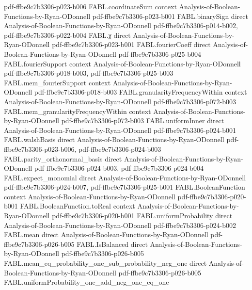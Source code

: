 \begin{theorem}
  {pdf-ffbe9c7b3306-p023-b006}
\proofstep
  {FABL.coordinateSum}
  {context}
  {Analysis-of-Boolean-Functions-by-Ryan-ODonnell}
  {pdf-ffbe9c7b3306-p023-b001}
\proofstep
  {FABL.binarySign}
  {direct}
  {Analysis-of-Boolean-Functions-by-Ryan-ODonnell}
  {pdf-ffbe9c7b3306-p014-b002,
    pdf-ffbe9c7b3306-p022-b004}
\proofstep
  {FABL.χ}
  {direct}
  {Analysis-of-Boolean-Functions-by-Ryan-ODonnell}
  {pdf-ffbe9c7b3306-p023-b001}
\proofstep
  {FABL.fourierCoeff}
  {direct}
  {Analysis-of-Boolean-Functions-by-Ryan-ODonnell}
  {pdf-ffbe9c7b3306-p025-b004}
\proofstep
  {FABL.fourierSupport}
  {context}
  {Analysis-of-Boolean-Functions-by-Ryan-ODonnell}
  {pdf-ffbe9c7b3306-p018-b003,
    pdf-ffbe9c7b3306-p025-b003}
\proofstep
  {FABL.mem_fourierSupport}
  {context}
  {Analysis-of-Boolean-Functions-by-Ryan-ODonnell}
  {pdf-ffbe9c7b3306-p018-b003}
\proofstep
  {FABL.granularityFrequencyWithin}
  {context}
  {Analysis-of-Boolean-Functions-by-Ryan-ODonnell}
  {pdf-ffbe9c7b3306-p072-b003}
\proofstep
  {FABL.mem_granularityFrequencyWithin}
  {context}
  {Analysis-of-Boolean-Functions-by-Ryan-ODonnell}
  {pdf-ffbe9c7b3306-p072-b003}
\proofstep
  {FABL.uniformInner}
  {direct}
  {Analysis-of-Boolean-Functions-by-Ryan-ODonnell}
  {pdf-ffbe9c7b3306-p024-b001}
\proofstep
  {FABL.walshBasis}
  {direct}
  {Analysis-of-Boolean-Functions-by-Ryan-ODonnell}
  {pdf-ffbe9c7b3306-p023-b006,
    pdf-ffbe9c7b3306-p024-b003}
\proofstep
  {FABL.parity_orthonormal_basis}
  {direct}
  {Analysis-of-Boolean-Functions-by-Ryan-ODonnell}
  {pdf-ffbe9c7b3306-p024-b003,
    pdf-ffbe9c7b3306-p024-b004}
\proofstep
  {FABL.expect_monomial}
  {direct}
  {Analysis-of-Boolean-Functions-by-Ryan-ODonnell}
  {pdf-ffbe9c7b3306-p024-b007,
    pdf-ffbe9c7b3306-p025-b001}
\proofstep
  {FABL.BooleanFunction}
  {context}
  {Analysis-of-Boolean-Functions-by-Ryan-ODonnell}
  {pdf-ffbe9c7b3306-p020-b001}
\proofstep
  {FABL.BooleanFunction.toReal}
  {context}
  {Analysis-of-Boolean-Functions-by-Ryan-ODonnell}
  {pdf-ffbe9c7b3306-p020-b001}
\proofstep
  {FABL.uniformProbability}
  {direct}
  {Analysis-of-Boolean-Functions-by-Ryan-ODonnell}
  {pdf-ffbe9c7b3306-p024-b002}
\proofstep
  {FABL.mean}
  {direct}
  {Analysis-of-Boolean-Functions-by-Ryan-ODonnell}
  {pdf-ffbe9c7b3306-p026-b005}
\proofstep
  {FABL.IsBalanced}
  {direct}
  {Analysis-of-Boolean-Functions-by-Ryan-ODonnell}
  {pdf-ffbe9c7b3306-p026-b005}
\proofstep
  {FABL.mean_eq_probability_one_sub_probability_neg_one}
  {direct}
  {Analysis-of-Boolean-Functions-by-Ryan-ODonnell}
  {pdf-ffbe9c7b3306-p026-b005}
\proofstep
  {FABL.uniformProbability_one_add_neg_one_eq_one}

\end{theorem}
